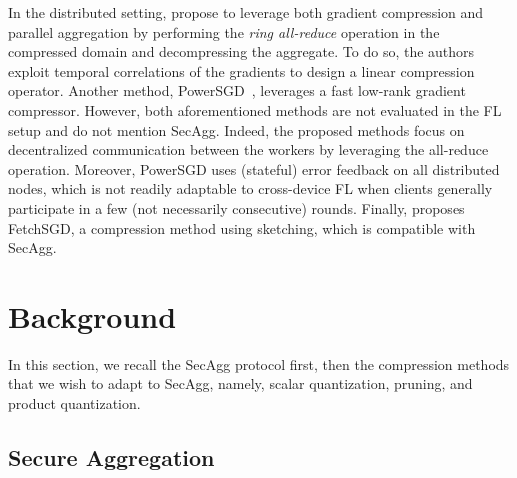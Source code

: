 \documentclass[11pt]{article}
\newcommand{\SecAgg}{{\sc SecAgg}\xspace}
\newcommand{\ilya}[1]{{\color{red}Ilya: #1}}
\begin{document}
 In the distributed setting, \cite{Graham-yu2018gradiveq} propose to leverage both gradient compression and parallel aggregation by performing the \emph{ring all-reduce} operation in the compressed domain and decompressing the aggregate. To do so, the authors exploit temporal correlations of the gradients to design a linear compression operator.
Another method, PowerSGD~\cite{Graham-vogels2019powersgd}, leverages a fast low-rank gradient compressor. However, both aforementioned methods are not evaluated in the FL setup and do not mention \SecAgg.
Indeed, the proposed methods focus on decentralized communication between the workers by leveraging the all-reduce operation.
Moreover, PowerSGD uses (stateful) error feedback on all distributed nodes, which is not readily adaptable to cross-device FL when clients generally participate in a few (not necessarily consecutive) rounds.
Finally, \cite{Graham-rothchild2020fetchsgd} proposes FetchSGD, a compression method using sketching, which is compatible with \SecAgg.






\newcommand{\parai}[1]{\noindent\textit{#1}}

\section{Background}
\label{sec:background}

In this section, we recall the \SecAgg protocol first, then the compression methods that we wish to adapt to \SecAgg, namely, scalar quantization, pruning, and product quantization.

\subsection{Secure Aggregation}
\label{subsec:secagg}
\end{document}
